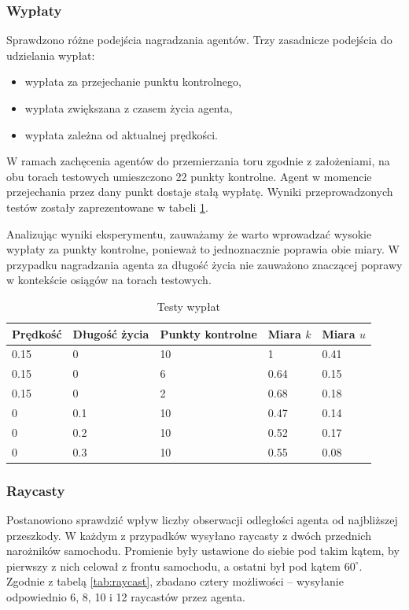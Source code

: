 \documentclass[a4paper,12pt]{article}
\begin{document}
\subsubsection{Wypłaty}
Sprawdzono różne podejścia nagradzania agentów. Trzy zasadnicze podejścia do udzielania wypłat:
\begin{itemize}
	\item wypłata za przejechanie punktu kontrolnego,
	\item wypłata zwiększana z czasem życia agenta,
	\item wypłata zależna od aktualnej prędkości.
\end{itemize}

W ramach zachęcenia agentów do przemierzania toru zgodnie z założeniami, na obu torach testowych umieszczono 22 punkty kontrolne. Agent w momencie przejechania przez dany punkt dostaje stałą wypłatę. Wyniki przeprowadzonych testów zostały zaprezentowane w tabeli \ref{tab:wyplaty}.

Analizując wyniki eksperymentu, zauważamy że warto wprowadzać wysokie wypłaty za punkty kontrolne, ponieważ to jednoznacznie poprawia obie miary. W przypadku nagradzania agenta za długość życia nie zauważono znaczącej poprawy w kontekście osiągów na torach testowych.

\begin{table}[H]
	\centering
	\smallskip
	\begin{tabular}{|l|l|l|l|l|}
		\hline
		Prędkość & Długość życia & Punkty kontrolne & Miara $k$ & Miara $u$ \\
		\hline
		0.15 & 0 & 10 & 1 & 0.41 \\
		0.15 & 0 & 6 & 0.64 & 0.15 \\
		0.15 & 0 & 2 & 0.68 & 0.18 \\ \hline
		0 & 0.1 & 10 & 0.47 & 0.14 \\
		0 & 0.2 & 10 & 0.52 & 0.17 \\
		0 & 0.3 & 10 & 0.55 & 0.08 \\ \hline
	\end{tabular}
	\caption{Testy wypłat}
	\label{tab:wyplaty}
\end{table}


\subsubsection{Raycasty}
Postanowiono sprawdzić wpływ liczby obserwacji odległości agenta od najbliższej przeszkody. W każdym z przypadków wysyłano raycasty z dwóch przednich narożników samochodu. Promienie były ustawione do siebie pod takim kątem, by pierwszy z nich celował z frontu samochodu, a ostatni był pod kątem $60^{\circ}$. Zgodnie z tabelą \ref{tab:raycast}, zbadano cztery możliwości -- wysyłanie odpowiednio 6, 8, 10 i 12 raycastów przez agenta.
\end{document}

